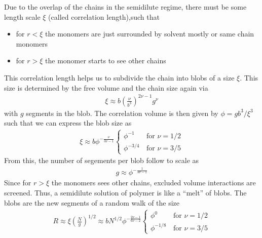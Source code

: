 \documentclass[letterpaper,10pt,english]{sphinxmanual}
\begin{document}
\sphinxAtStartPar
Due to the overlap of the chains in the semidilute regime, there must be some length scale \(\xi\) (called correlation length),such that
\begin{itemize}
\item {} 
\sphinxAtStartPar
for \(r<\xi\) the monomers are just surrounded by solvent mostly or same chain monomers

\item {} 
\sphinxAtStartPar
for \(r>\xi\) the monomer starts to see other chains

\end{itemize}

\sphinxAtStartPar
This correlation length helps us to subdivide the chain into blobs of a size \(\xi\). This size is determined by the free volume and the chain size again via
\begin{equation*}
\begin{split}\xi \approx b \left ( \frac{\nu}{b^3}\right )^{2\nu-1} g^{\nu}\end{split}
\end{equation*}
\sphinxAtStartPar
with \(g\) segments in the blob. The correlation volume is then given by \(\phi=gb^3/\xi^3\) such that we can express the blob size as
\begin{equation*}
\begin{split}\xi \approx b\phi^{-\frac{\nu}{3\nu-1}}
\begin{cases}\phi^{-1}\,&\text{for }\nu=1/2\\
\phi^{-3/4}\,&\text{for }\nu=3/5\end{cases}\end{split}
\end{equation*}
\sphinxAtStartPar
From this, the number of segements per blob follow to scale as
\begin{equation*}
\begin{split}g\approx \phi^{-\frac{1}{3\nu-1}}\end{split}
\end{equation*}
\sphinxAtStartPar
Since for \(r>\xi\) the monomers sees other chains, excluded volume interactions are screened. Thus, a semidilute solution of polymer is like a “melt” of blobs. The blobs are the new segments of a random walk of the size
\begin{equation*}
\begin{split}R\approx \xi \left ( \frac{N}{g}\right )^{1/2}\approx bN^{1/2}\phi^{-\frac{2\nu-1}{6\nu-2}}\begin{cases}
\phi^{0}\, & \text{for }\nu=1/2\\
\phi^{-1/8}\, & \text{for }\nu=3/5
\end{cases}\end{split}
\end{equation*}
\end{document}
